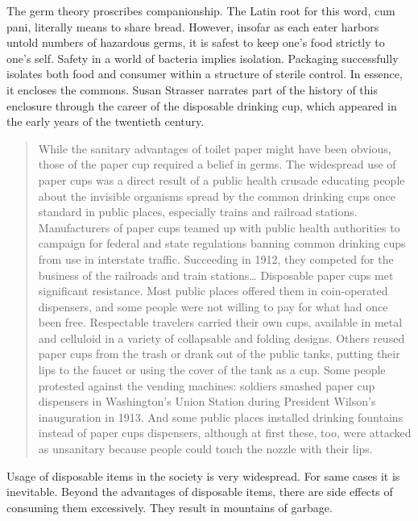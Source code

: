 
The germ theory proscribes companionship. The Latin root for this word, cum pani, literally means to share bread. However, insofar as each eater harbors untold numbers of hazardous germs, it is safest to keep one’s food strictly to one’s self. Safety in a world of bacteria implies isolation. Packaging successfully isolates both food and consumer within a structure of sterile control. In essence, it encloses the commons. Susan Strasser narrates part of the history of this enclosure through the career of the disposable drinking cup, which appeared in the early years of the twentieth century.


\begin{quote}
While the sanitary advantages of toilet paper might have been obvious, those of the paper cup required a belief in germs. The widespread use of paper cups was a direct result of a public health crusade educating people about the invisible organisms spread by the common drinking cups once standard in public places, especially trains and railroad stations. Manufacturers of paper cups teamed up with public health authorities to campaign for federal and state regulations banning common drinking cups from use in interstate traffic. Succeeding in 1912, they competed for the business of the railroads and train stations\ldots
Disposable paper cups met significant resistance. Most public places offered them in coin-operated dispensers, and some people were not willing to pay for what had once been free. Respectable travelers carried their own cups, available in metal and celluloid in a variety of collapsable and folding designs. Others reused paper cups from the trash or drank out of the public tanks, putting their lips to the faucet or using the cover of the tank as a cup. Some people protested against the vending machines: soldiers smashed paper cup dispensers in Washington’s Union Station during President Wilson’s inauguration in 1913. And some public places installed drinking fountains instead of paper cups dispensers, although at first these, too, were attacked as unsanitary because people could touch the nozzle with their lips. \citep{strasser1999waste}
\end{quote}

Usage of disposable items in the society is very widespread. For same cases it is inevitable. Beyond the advantages of disposable items, there are side effects of consuming them excessively. They result in mountains of garbage.

